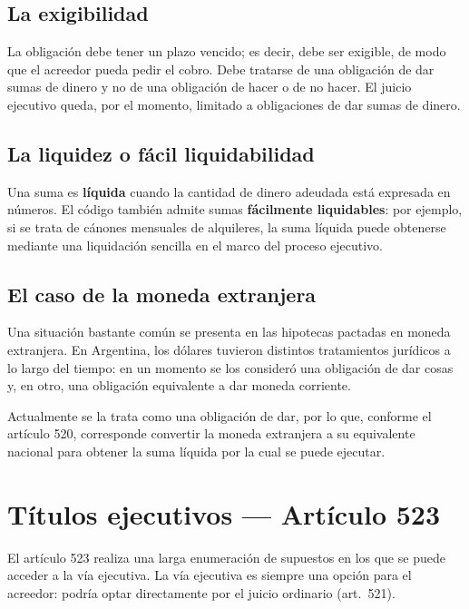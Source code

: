 \documentclass[12pt,oneside]{book}
\begin{document}
\subsection{La exigibilidad}

La obligación debe tener un plazo vencido; es decir, debe ser exigible, de modo que el acreedor pueda pedir el cobro. Debe tratarse de una obligación de dar sumas de dinero y no de una obligación de hacer o de no hacer. El juicio ejecutivo queda, por el momento, limitado a obligaciones de dar sumas de dinero.

\subsection{La liquidez o fácil liquidabilidad}

Una suma es \textbf{líquida} cuando la cantidad de dinero adeudada está expresada en números. El código también admite sumas \textbf{fácilmente liquidables}: por ejemplo, si se trata de cánones mensuales de alquileres, la suma líquida puede obtenerse mediante una liquidación sencilla en el marco del proceso ejecutivo.

\subsection{El caso de la moneda extranjera}

Una situación bastante común se presenta en las hipotecas pactadas en moneda extranjera. En Argentina, los dólares tuvieron distintos tratamientos jurídicos a lo largo del tiempo: en un momento se los consideró una obligación de dar cosas y, en otro, una obligación equivalente a dar moneda corriente.

Actualmente se la trata como una obligación de dar, por lo que, conforme el artículo 520, corresponde convertir la moneda extranjera a su equivalente nacional para obtener la suma líquida por la cual se puede ejecutar.

\section{Títulos ejecutivos --- Artículo 523}

El artículo 523 realiza una larga enumeración de supuestos en los que se puede acceder a la vía ejecutiva. La vía ejecutiva es siempre una opción para el acreedor: podría optar directamente por el juicio ordinario (art.~521).
\end{document}
